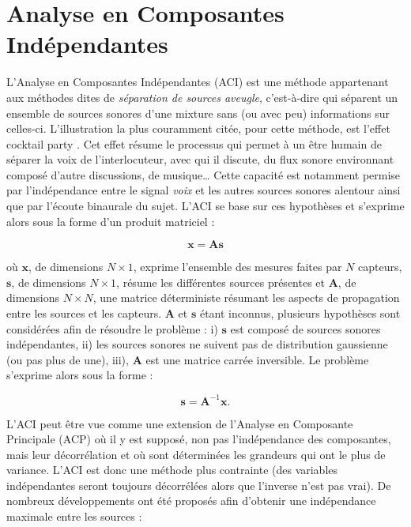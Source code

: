 
\section{Analyse en Composantes Indépendantes}
L'Analyse en Composantes Indépendantes (ACI) \cite{comon_independent_1994, jutten1991blind} est une méthode appartenant aux méthodes dites de \textit{séparation de sources aveugle}, c'est-à-dire qui séparent un ensemble de sources sonores d'une mixture sans (ou avec peu) informations sur celles-ci. L'illustration la plus couramment citée, pour cette méthode, est l'effet \og cocktail party \fg{}. Cet effet résume le processus qui permet à un être humain de séparer la voix de l'interlocuteur, avec qui il discute, du flux sonore environnant composé d'autre discussions, de musique\dots{} Cette capacité est notamment permise par l'indépendance entre le signal \textit{voix} et les autres sources sonores alentour ainsi que par l'écoute binaurale du sujet. L'ACI se base sur ces hypothèses et s'exprime alors sous la forme d'un produit matriciel :

\begin{equation}\label{eq:ACI2}
\mathbf{x} = \mathbf{As}
\end{equation}

où $\mathbf{x}$, de dimensions $N \times 1$, exprime l'ensemble des mesures faites par $N$ capteurs, $\mathbf{s}$, de dimensions $N \times 1$, résume les différentes sources présentes et $\mathbf{A}$, de dimensions $N \times N$, une matrice déterministe résumant les aspects de propagation entre les sources et les capteurs.
$\mathbf{A}$ et $\mathbf{s}$ étant inconnus, plusieurs hypothèses sont considérées afin de résoudre le problème : i) $\mathbf{s}$ est composé de sources sonores indépendantes, ii) les sources sonores ne suivent pas de distribution gaussienne (ou pas plus de une), iii), $\mathbf{A}$ est une matrice carrée inversible. Le problème s'exprime alors sous la forme :

\begin{equation}
\mathbf{s} = \mathbf{A}^{-1}\mathbf{x}.
\end{equation}

L'ACI peut être vue comme une extension de l'Analyse en Composante Principale (ACP) où il y est supposé, non pas l'indépendance des composantes, mais leur décorrélation et où sont déterminées les grandeurs qui ont le plus de variance. L'ACI est donc une méthode plus contrainte (des variables indépendantes seront toujours décorrélées alors que l'inverse n'est pas vrai).
De nombreux développements ont été proposés afin d'obtenir une indépendance maximale entre les sources :

